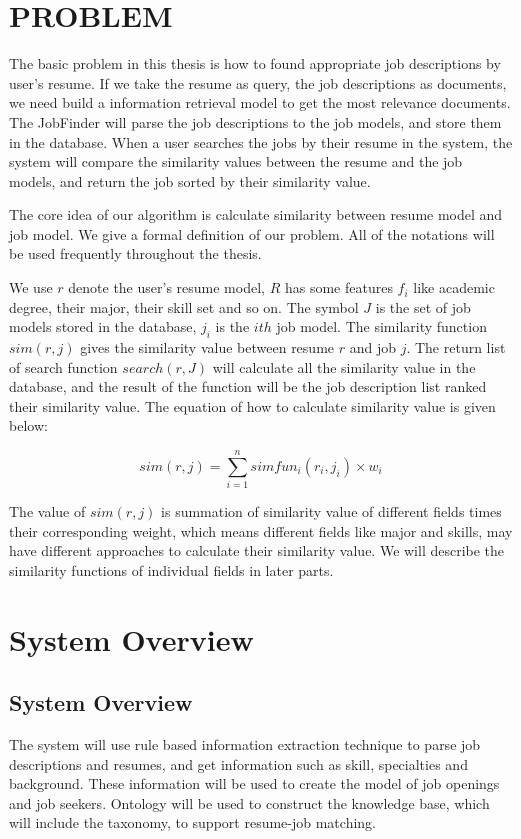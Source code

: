 \chapter{PROBLEM}

The basic problem in this thesis is how to found appropriate job descriptions by user's resume. If we take the resume as query, the job descriptions as documents, we need build a information retrieval model to get the most relevance documents.  The JobFinder will parse the job descriptions to the job models, and store them in the database. When a user searches the jobs by their resume in the system, the system will compare the similarity values between the resume and the job models, and return the job sorted by their similarity value.

The core idea of our algorithm is calculate similarity between resume model and job model.
We give a formal definition of our problem. All of the notations will be used frequently throughout the thesis.

We use $r$ denote the user's resume model, $R$ has some features $f_i$ like academic degree, their major, their skill set and so on. The symbol $J$ is the set of job models stored in the database, $j_i$ is the $ith$ job model. The similarity function $sim(r, j)$ gives the similarity value between resume $r$ and job $j$. The return list of search function $search(r,J)$ will calculate all the similarity value in the database, and the result of the function will be the job description list ranked their similarity value. The equation of how to calculate similarity value is given below:

$$ sim(r, j) = \sum_{i=1}^{n} simfun_i(r_i,j_i) \times w_i $$

The value of $sim(r, j)$ is summation of similarity value of different fields times their corresponding weight, which means different fields like major and skills,  may have different approaches to calculate their similarity value. We will describe the similarity functions of individual fields in later parts.



\chapter{System Overview}

\section{System Overview}
The system will use rule based information extraction technique to parse job descriptions and resumes, and get information such as skill, specialties and background. These information will be used to create the model of job openings and job seekers. Ontology will be used to construct the knowledge base, which will include the taxonomy, to support resume-job matching.

